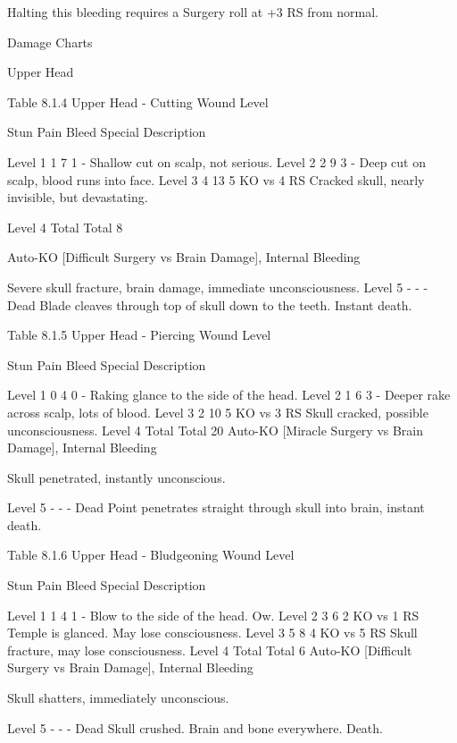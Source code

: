 \documentclass[oneside,11pt,english]{book}
\begin{document}
Halting this bleeding requires a Surgery roll at +3 RS from normal. 

 

 

Damage Charts 

 

Upper Head 

 
Table 8.1.4 Upper Head - Cutting 
Wound 
Level 

Stun Pain Bleed Special Description 

Level 1 1 7 1 - Shallow cut on scalp, not serious. 
Level 2 2 9 3 - Deep cut on scalp, blood runs into face. 
Level 3 4 13 5 KO vs 4 RS Cracked skull, nearly invisible, but 
devastating. 

Level 4 Total Total 8 

Auto-KO 
[Difficult Surgery vs Brain 
Damage], Internal Bleeding 

Severe skull fracture, brain damage, 
immediate unconsciousness. 
Level 5 - - - Dead Blade cleaves through top of skull down to 
the teeth. Instant death. 

 

 

 


Table 8.1.5 Upper Head - Piercing 
Wound 
Level 

Stun Pain Bleed Special Description 

Level 1 0 4 0 - Raking glance to the side of the head. 
Level 2 1 6 3 - Deeper rake across scalp, lots of blood. 
Level 3 2 10 5 KO vs 3 RS Skull cracked, possible unconsciousness. 
Level 4 Total Total 20 Auto-KO 
[Miracle Surgery vs Brain 
Damage], Internal Bleeding 

Skull penetrated, instantly unconscious. 

Level 5 - - - Dead Point penetrates straight through skull 
into brain, instant death. 

 
Table 8.1.6 Upper Head - Bludgeoning 
Wound 
Level 

Stun Pain Bleed Special Description 

Level 1 1 4 1 - Blow to the side of the head. Ow. 
Level 2 3 6 2 KO vs 1 RS Temple is glanced. May lose 
consciousness. 
Level 3 5 8 4 KO vs 5 RS Skull fracture, may lose 
consciousness. 
Level 4 Total Total 6 Auto-KO 
[Difficult Surgery vs Brain Damage], 
Internal Bleeding 

Skull shatters, immediately 
unconscious. 

Level 5 - - - Dead Skull crushed. Brain and bone 
everywhere. Death. 
\end{document}
